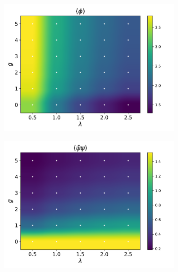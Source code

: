 \begin{figure}[]
    \centering
    \begin{subfigure}[b]{0.47\textwidth}
        \includegraphics[width=\textwidth]{figures/phase_diagram/g-lam/phase_diagram_phi.pdf}
    \end{subfigure}
    \begin{subfigure}[b]{0.47\textwidth}
        \includegraphics[width=\textwidth]{figures/phase_diagram/g-lam/phase_diagram_cond.pdf}
    \end{subfigure}
    \begin{subfigure}[b]{0.47\textwidth}

\end{subfigure}
\end{figure}
